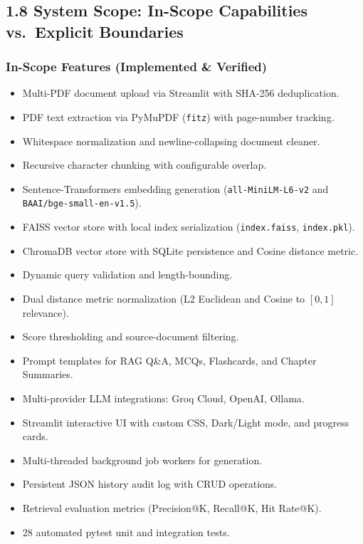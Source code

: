 \documentclass[
]{article}
\providecommand{\tightlist}{%
  \setlength{\itemsep}{0pt}\setlength{\parskip}{0pt}}
\begin{document}
\subsection{1.8 System Scope: In-Scope Capabilities vs.~Explicit
Boundaries}\label{system-scope-in-scope-capabilities-vs.-explicit-boundaries}

\subsubsection{In-Scope Features (Implemented \&
Verified)}\label{in-scope-features-implemented-verified}

\begin{itemize}
\tightlist
\item
  Multi-PDF document upload via Streamlit with SHA-256 deduplication.
\item
  PDF text extraction via PyMuPDF (\texttt{fitz}) with page-number
  tracking.
\item
  Whitespace normalization and newline-collapsing document cleaner.
\item
  Recursive character chunking with configurable overlap.
\item
  Sentence-Transformers embedding generation (\texttt{all-MiniLM-L6-v2}
  and \texttt{BAAI/\allowbreak bge-small-en-v1.5}).
\item
  FAISS vector store with local index serialization
  (\texttt{index.\allowbreak faiss}, \texttt{index.\allowbreak pkl}).
\item
  ChromaDB vector store with SQLite persistence and Cosine distance
  metric.
\item
  Dynamic query validation and length-bounding.
\item
  Dual distance metric normalization (L2 Euclidean and Cosine to
  \([0, 1]\) relevance).
\item
  Score thresholding and source-document filtering.
\item
  Prompt templates for RAG Q\&A, MCQs, Flashcards, and Chapter
  Summaries.
\item
  Multi-provider LLM integrations: Groq Cloud, OpenAI, Ollama.
\item
  Streamlit interactive UI with custom CSS, Dark/Light mode, and
  progress cards.
\item
  Multi-threaded background job workers for generation.
\item
  Persistent JSON history audit log with CRUD operations.
\item
  Retrieval evaluation metrics (Precision@K, Recall@K, Hit Rate@K).
\item
  28 automated pytest unit and integration tests.
\end{itemize}
\end{document}
